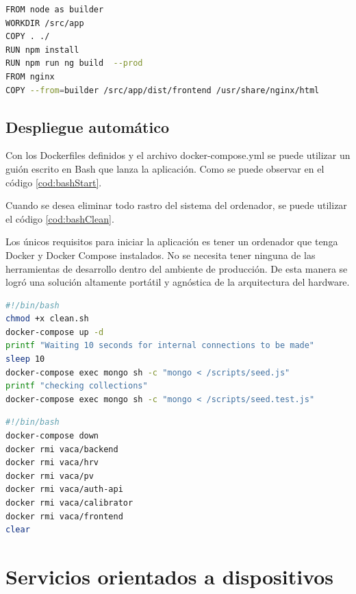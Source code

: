 \begin{lstlisting}[language=bash,label=cod:dfFrontend,caption=Dockerfile del servicio Frontend.]
FROM node as builder
WORKDIR /src/app
COPY . ./
RUN npm install
RUN npm run ng build  --prod
FROM nginx
COPY --from=builder /src/app/dist/frontend /usr/share/nginx/html
\end{lstlisting}

\subsection{Despliegue automático}

Con los Dockerfiles definidos y el archivo docker-compose.yml se puede utilizar un guión escrito en Bash que lanza la aplicación.
Como se puede observar en el código \ref{cod:bashStart}.

Cuando se desea eliminar todo rastro del sistema del ordenador, se puede utilizar el código \ref{cod:bashClean}.

Los únicos requisitos para iniciar la aplicación es tener un ordenador que tenga Docker y Docker Compose instalados.
No se necesita tener ninguna de las herramientas de desarrollo dentro del ambiente de producción.
De esta manera se logró una solución altamente portátil y agnóstica de la arquitectura del hardware.

\begin{lstlisting}[language=bash,label=cod:bashStart,caption=Guión de inicialización.]
#!/bin/bash
chmod +x clean.sh
docker-compose up -d
printf "Waiting 10 seconds for internal connections to be made"
sleep 10
docker-compose exec mongo sh -c "mongo < /scripts/seed.js"
printf "checking collections"
docker-compose exec mongo sh -c "mongo < /scripts/seed.test.js"
\end{lstlisting}

\begin{lstlisting}[language=bash,label=cod:bashClean,caption=Guión de limpieza.]
#!/bin/bash
docker-compose down
docker rmi vaca/backend
docker rmi vaca/hrv
docker rmi vaca/pv
docker rmi vaca/auth-api
docker rmi vaca/calibrator
docker rmi vaca/frontend
clear
\end{lstlisting}


\section{Servicios orientados a dispositivos}

